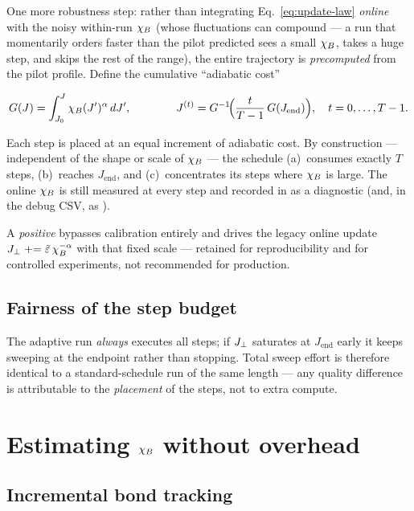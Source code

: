 One more robustness step: rather than integrating
Eq.~\eqref{eq:update-law} \emph{online} with the noisy within-run $\chi_B$
(whose fluctuations can compound --- a run that momentarily orders faster than
the pilot predicted sees a small $\chi_B$, takes a huge step, and skips the
rest of the range), the entire trajectory is \emph{precomputed} from the
pilot profile. Define the cumulative ``adiabatic cost''
\begin{keyeq}
\begin{equation}
G(J)=\int_{J_0}^{J}\chi_B(J')^{\alpha}\,dJ' ,
\qquad\qquad
J^{(t)}=G^{-1}\!\Bigl(\frac{t}{T-1}\,G(J_{\mathrm{end}})\Bigr),
\quad t=0,\dots,T-1 .
\label{eq:inverse-cdf}
\end{equation}
\end{keyeq}
Each step is placed at an equal increment of adiabatic cost. By
construction --- independent of the shape or scale of $\chi_B$ --- the schedule
(a)~consumes exactly $T$ steps, (b)~reaches $J_{\mathrm{end}}$, and
(c)~concentrates its steps where $\chi_B$ is large. The online $\chi_B$ is
still measured at every step and recorded in  as a
diagnostic (and, in the debug CSV, as ).

A \emph{positive}  bypasses calibration entirely and drives
the legacy online update $J_{\perp}\mathrel{+}=\tilde{\varepsilon}\,\chi_B^{-\alpha}$ with that
fixed scale --- retained for reproducibility and for controlled experiments,
not recommended for production.

\subsection{Fairness of the step budget}

The adaptive run \emph{always} executes all  steps; if
$J_{\perp}$ saturates at $J_{\mathrm{end}}$ early it keeps sweeping at the
endpoint rather than stopping. Total sweep effort is therefore identical to
a standard-schedule run of the same length --- any quality difference is
attributable to the \emph{placement} of the steps, not to extra compute.

\section{Estimating \texorpdfstring{$\chi_B$}{chi\_B} without overhead}
\label{sec:chib-est}

\subsection{Incremental bond tracking}

